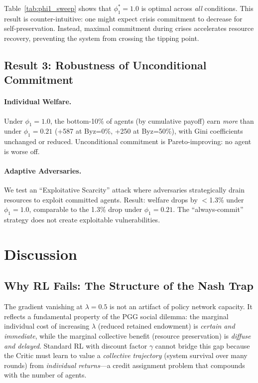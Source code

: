 \documentclass{article}
\begin{document}
Table~\ref{tab:phi1_sweep} shows that $\phi_1^* = 1.0$ is optimal across \emph{all} conditions.
This result is counter-intuitive: one might expect crisis commitment to decrease for self-preservation.
Instead, maximal commitment during crises accelerates resource recovery, preventing the system from crossing the tipping point.

\subsection{Result 3: Robustness of Unconditional Commitment}
\label{sec:robustness}

\paragraph{Individual Welfare.}
Under $\phi_1 = 1.0$, the bottom-10\% of agents (by cumulative payoff) earn \emph{more} than under $\phi_1 = 0.21$ (+587 at Byz=0\%, +250 at Byz=50\%), with Gini coefficients unchanged or reduced.
Unconditional commitment is Pareto-improving: no agent is worse off.

\paragraph{Adaptive Adversaries.}
We test an ``Exploitative Scarcity'' attack where adversaries strategically drain resources to exploit committed agents.
Result: welfare drops by $<$1.3\% under $\phi_1 = 1.0$, comparable to the 1.3\% drop under $\phi_1 = 0.21$.
The ``always-commit'' strategy does not create exploitable vulnerabilities.

\section{Discussion}
\label{sec:discussion}

\subsection{Why RL Fails: The Structure of the Nash Trap}

The gradient vanishing at $\lambda = 0.5$ is not an artifact of policy network capacity.
It reflects a fundamental property of the PGG social dilemma: the marginal individual cost of increasing $\lambda$ (reduced retained endowment) is \emph{certain and immediate}, while the marginal collective benefit (resource preservation) is \emph{diffuse and delayed}.
Standard RL with discount factor $\gamma$ cannot bridge this gap because the Critic must learn to value a \emph{collective trajectory} (system survival over many rounds) from \emph{individual returns}---a credit assignment problem that compounds with the number of agents.
\end{document}
